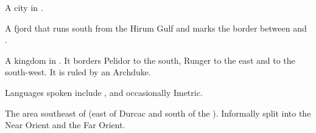\begin{gloss}
\begin{subgloss}
  \begin{comment}
  \subparagraph{Bendaire}
  \end{comment}
  A city in \Marcil. 
\end{subgloss}







\begin{comment}
\paragraph{Nerim}
\end{comment}
A fjord that runs south from the Hirum Gulf and marks the border between  and . 







\begin{comment}
\paragraph{Ontephar}
\end{comment}
A kingdom in \PelidorContinent. 
It borders Pelidor to the south, Runger to the east and  to the south-west. 
It is ruled by an Archduke. 

Languages spoken include \Velcadian{}, \Tepharin{} and occasionally Imetric. 







\begin{comment}
\paragraph{Orient}
\end{comment}
The area southeast of \Velcad{} (east of Durcac and south of the {\Serplands}). 
Informally split into the {Near Orient} and the {Far Orient}.  








\end{gloss}
